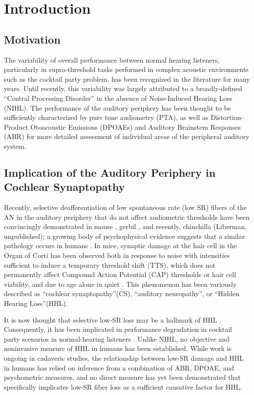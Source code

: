 \chapter{Introduction}
\label{chapter:Introduction}
\thispagestyle{myheadings}
\section{Motivation}
The variability of overall performance between normal hearing listeners, particularly in supra-threshold tasks performed in complex acoustic environments such as the cocktail party problem, has been recognized in the literature for many years.  Until recently, this variability was largely attributed to a broadly-defined ``Central Processing Disorder'' in the absence of Noise-Induced Hearing Loss (NIHL). The performance of the auditory periphery has been thought to be sufficiently characterized by pure tone audiometry (PTA), as well as Distortion-Product Otoacoustic Emissions (DPOAEs) and Auditory Brainstem Responses (ABR) for more detailed assessment of individual areas of the peripheral auditory system.

\section{Implication of the Auditory Periphery in Cochlear Synaptopathy}
Recently, selective deafferentiation of low spontaneous rate (low SR) fibers of the AN in the auditory periphery that do not affect audiometric thresholds have been convincingly demonstrated in mouse \citep{Kujawa2009Adding}, gerbil \citep{Furman2013NoiseInduced}, and recently, chinchilla (Liberman, unpublished); a growing body of psychophysical evidence suggests that a similar pathology occurs in humans \citep{Bharadwaj2015Individual}.  In mice, synaptic damage at the hair cell in the Organ of Corti has been observed both in response to noise with intensities sufficient to induce a temporary threshold shift (TTS), which does not permanently affect Compound Action Potential (CAP) thresholds or hair cell viability, and due to age alone in quiet \citep{Sergeyenko2013AgeRelated,Fernandez2015Aging}. This phenomenon has been variously described as ``cochlear synaptopathy''(CS)\citep{Bharadwaj2014Cochlear}, ``auditory neuropathy'', or ``Hidden Hearing Loss''(HHL).  

It is now thought that selective low-SR loss may be a hallmark of HHL \citep{Furman2013NoiseInduced,Bharadwaj2014Cochlear,Bharadwaj2015Individual,Schaette2011Tinnitus}. Consequently, it has been implicated in performance degradation in cocktail party scenarios in normal-hearing listeners \citep{Bharadwaj2015Individual,Bharadwaj2014Cochlear}.  Unlike NIHL, no objective and noninvasive measure of HHL in humans has been established.  While work is ongoing in cadaveric studies, the relationship between low-SR damage and HHL in humans has relied on inference from a combination of ABR, DPOAE, and psychometric measures, and no direct measure has yet been demonstrated that specifically implicates low-SR fiber loss as a sufficient causative factor for HHL.

